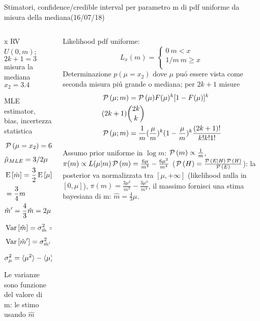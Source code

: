 \begin{wordonframe}{Stimatori, confidence/credible interval per parametro m di pdf uniforme da misura della mediana(16/07/18)}
\begin{columns}[T]\begin{column}{0.5\textwidth}
x RV $U(0,m)$; $2k+1=3$ misura la mediana $x_2=3.4$
\begin{block}{MLE estimator, bias, incertezza statistica}
\begin{align*}
&\operatorname{\mathcal{P}}{(\mu=x_2)}=6\frac{\mu}{m^2}(1-\frac{\mu}{m})\\
&\hat{\mu}_{MLE}=3/2\mu\\
&\operatorname{E}{[\hat{m}]}=\frac{3}{2}\operatorname{E}{[\mu]}\frac{3}{2}\int_0^{m}\mu\operatorname{\mathcal{P}}{(\mu)}\,d\mu\\
&=\frac{3}{4}m\\
&\hat{m}'=\frac{4}{3}\hat{m}=2\mu\\
&\operatorname{Var}{[\hat{m}]}=\sigma^2_{\hat{m}}=\frac{9}{4}\operatorname{Var}{\mu}=\frac{9}{4}\sigma_{\mu}^2\\
&\operatorname{Var}{[\hat{m}']}=\sigma^2_{\hat{m}'}=4\operatorname{Var}{\mu}=4\sigma_{\mu}^2\\
&\sigma^2_{\mu}=\langle \mu^2 \rangle-\langle \mu \rangle^2=\frac{m^2}{20}
\end{align*}
Le varianze sono funzione del valore di m: le stimo usando $\hat{m}$
\end{block}
\end{column}\begin{column}{0.5\textwidth}
Likelihood pdf uniforme: \begin{equation*}L_x(m)=\left\{\begin{array}{c}
0\ m<x\\
1/m\ m\geq x\\
\end{array}\right.
\end{equation*}
Determinazione $p(\mu=x_2)$ dove $\mu$ pu\'o essere vista come seconda misura pi\'u grande o mediana; per $2k+1$ misure
\begin{align*}
&\operatorname{\mathcal{P}}{(\mu;m)}=\operatorname{\mathcal{P}}{(\mu)}F(\mu)^k[1-F(\mu)]^k\\
&(2k+1)\binom{2k}{k}\\
&\operatorname{\mathcal{P}}{(\mu;m)}=\frac{1}{m}(\frac{\mu}{m})^k(1-\frac{\mu}{m})^k\frac{(2k+1)!}{k!k!1!}
\end{align*}
\vspace{5cm}
\begin{block}{}
Assumo prior uniforme in $\log{m}$: $\operatorname{\mathcal{P}}{(m)}\propto\frac{1}{m}$,  $\pi(m)\propto L(\mu|m)\operatorname{\mathcal{P}}{(m)}=\frac{6\mu}{m^3}-\frac{6\mu^2}{m^4}$ ($\operatorname{\mathcal{P}}{(H)}=\frac{\operatorname{\mathcal{P}}{(E|H)\operatorname{\mathcal{P}}{(H)}}}{\operatorname{\mathcal{P}}{(E)}}$): la posterior va normalizzata tra $[\mu,+\infty]$ (likelihood nulla  in $[0,\mu]$), $\pi(m)=\frac{3\mu^2}{m^3}-\frac{3\mu^3}{m^4}$, il massimo fornisci una stima bayesiana di m: $\hat{m}=\frac{4}{3}\mu$.
\end{block}
\end{column}\end{columns}
\end{wordonframe}

